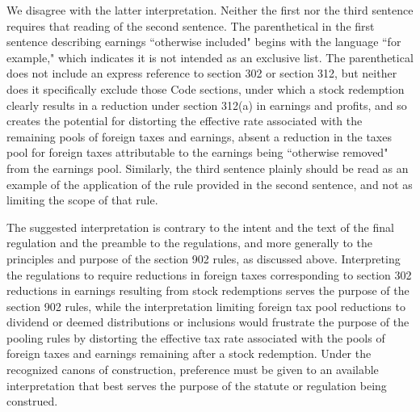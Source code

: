 \begin{select}
We disagree with the latter interpretation. Neither the first nor the third sentence requires that reading of the second sentence. The parenthetical in the first sentence describing earnings ``otherwise included" begins with the language ``for example," which indicates it is not intended as an exclusive list. The parenthetical does not include an express reference to section 302 or section 312, but neither does it specifically exclude those Code sections, under which a stock redemption clearly results in a reduction under section 312(a) in earnings and profits, and so creates the potential for distorting the effective rate associated with the remaining pools of foreign taxes and earnings, absent a reduction in the taxes pool for foreign taxes attributable to the earnings being ``otherwise removed" from the earnings pool. Similarly, the third sentence plainly should be read as an example of the application of the rule provided in the second sentence, and not as limiting the scope of that rule.

The suggested interpretation is contrary to the intent and the text of the final regulation and the preamble to the regulations, and more generally to the principles and purpose of the section 902 rules, as discussed above. Interpreting the regulations to require reductions in foreign taxes corresponding to section 302 reductions in earnings resulting from stock redemptions serves the purpose of the section 902 rules, while the interpretation  limiting foreign tax pool reductions to dividend or deemed distributions or inclusions would frustrate the purpose of the pooling rules by distorting the effective tax rate associated with the pools of foreign taxes and earnings remaining after a stock redemption. Under the recognized canons of construction, preference must be given to an available interpretation that best serves the purpose of the statute or regulation being construed. 


\end{select}



